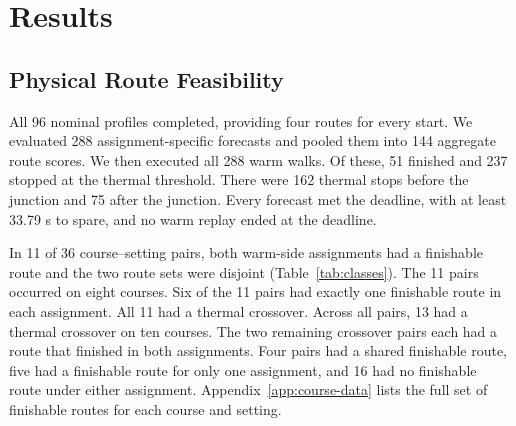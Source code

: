 \documentclass{ieeeaccess}
\begin{document}
\section{Results}

\subsection{Physical Route Feasibility}

All 96 nominal profiles completed, providing four routes for every start. We evaluated 288 assignment-specific forecasts and pooled them into 144 aggregate route scores. We then executed all 288 warm walks. Of these, 51 finished and 237 stopped at the thermal threshold. There were 162 thermal stops before the junction and 75 after the junction. Every forecast met the deadline, with at least 33.79 s to spare, and no warm replay ended at the deadline.

In 11 of 36 course--setting pairs, both warm-side assignments had a finishable route and the two route sets were disjoint (Table~\ref{tab:classes}). The 11 pairs occurred on eight courses. Six of the 11 pairs had exactly one finishable route in each assignment. All 11 had a thermal crossover. Across all pairs, 13 had a thermal crossover on ten courses. The two remaining crossover pairs each had a route that finished in both assignments. Four pairs had a shared finishable route, five had a finishable route for only one assignment, and 16 had no finishable route under either assignment. Appendix~\ref{app:course-data} lists the full set of finishable routes for each course and setting.
\end{document}
